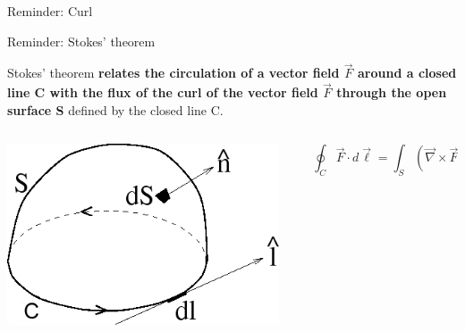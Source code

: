 {\begin{frame}{Reminder: Curl}
\end{frame}

%
%
%

\begin{frame}{Reminder: Stokes' theorem}

Stokes' theorem {\bf relates
the circulation of a vector field $\vec{F}$ around a closed line C
with the flux of the curl of the vector field $\vec{F}$ through the open surface S} defined by the closed line C.\\

\vspace{0.5cm}

\begin{columns}
  \begin{column}{0.45\textwidth}
   \begin{center}
     \includegraphics[width=0.95\textwidth]{./images/schematics/stokes_theorem_C.png}
   \end{center}
  \end{column}
  \begin{column}{0.45\textwidth}
  {\Large
    \begin{equation*}
      \oint_{C} \vec{F} \cdot d\vec{\ell} = \int_{S} (\vec{\nabla} \times \vec{F}) \cdot d\vec{S}
    \end{equation*}
  }
  \end{column}
\end{columns}

\end{frame}

} %

%
%
%

